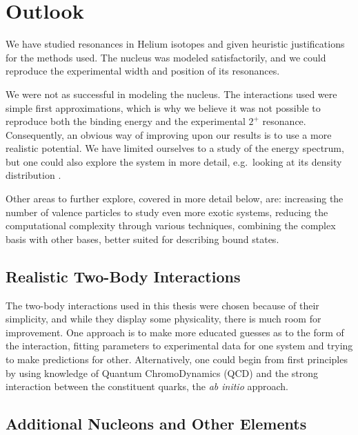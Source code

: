 \documentclass[../main/report.tex]{subfiles}
\begin{document}
\chapter{Outlook}
\label{cha:outlook}


We have studied resonances in Helium isotopes and given heuristic justifications for the methods used. The  nucleus was modeled satisfactorily, and we could reproduce the experimental width and position of its resonances.

We were not as successful in modeling the  nucleus. The interactions used were simple first approximations, which is why we believe it was not possible to reproduce both the binding energy and the experimental $2^+$ resonance. 
Consequently, an obvious way of improving upon our results is to use a more realistic potential. 
We have limited ourselves to a study of the energy spectrum, but one could also explore the  system in more detail, e.g.~looking at its density distribution \cite{radii}.

Other areas to further explore, covered in more detail below, are: increasing the number of valence particles to study even more exotic systems, reducing the computational complexity through various techniques, combining the complex basis with other bases, better suited for describing bound states.

\section{Realistic Two-Body Interactions}
The two-body interactions used in this thesis were chosen because of their simplicity, and while they display some physicality, there is much room for improvement. 
One approach is to make more educated guesses as to the form of the interaction, fitting parameters to experimental data for one system and trying to make predictions for other.
Alternatively, one could begin from first principles by using knowledge of Quantum ChromoDynamics (QCD) and the strong interaction between the constituent quarks, the \emph{ab initio} approach.

\section{Additional Nucleons and Other Elements}
\end{document}
